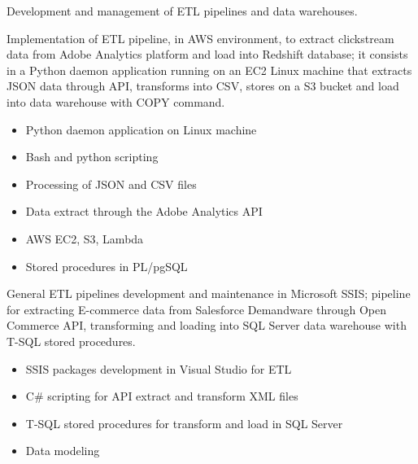 \documentclass[10pt,a4paper,ragged2e,withhyper]{altacv}
\begin{document}
\begin{paracol}{2}

Development and management of ETL pipelines and data warehouses. 

{\addtolength{\leftskip}{5mm}

    
    Implementation of ETL pipeline, in AWS environment, to extract clickstream data from Adobe Analytics platform and load into Redshift database; it consists in a Python daemon application running on an EC2 Linux machine that extracts JSON data through API, transforms into CSV, stores on a S3 bucket and load into data warehouse with COPY command.
    \smallskip
    \begin{itemize}[leftmargin=10mm]
      \item Python daemon application on Linux machine
      \item Bash and python scripting
      \item Processing of JSON and CSV files
      \item Data extract through the Adobe Analytics API 
      \item AWS EC2, S3, Lambda
      \item Stored procedures in PL/pgSQL 
    \end{itemize}
    
    \medskip
    
    General ETL pipelines development and maintenance in Microsoft SSIS; pipeline for extracting E-commerce data from Salesforce Demandware through Open Commerce API, transforming and loading into SQL Server data warehouse with T-SQL stored procedures.
    \smallskip
    \begin{itemize}[leftmargin=10mm]
      \item SSIS packages development in Visual Studio for ETL
      \item C\# scripting for API extract and transform XML files
      \item T-SQL stored procedures for transform and load in SQL Server
      \item Data modeling
    \end{itemize}
}



\end{paracol}
\end{document}
